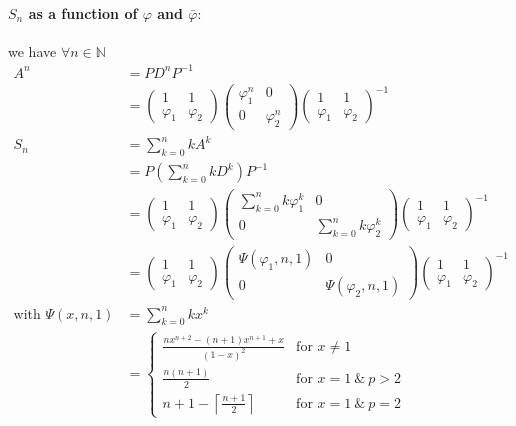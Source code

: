 \documentclass[]{article}
\begin{document}
\paragraph{$S_n$ as a function of $\varphi$ and $\bar\varphi:$}
we have $\forall n\in\mathbb{N}$
\begin{align*}
	A^n&=PD^nP^{-1}\\
	&=\begin{pmatrix}
		1 & 1 \\ \varphi_1 & \varphi_2 
	\end{pmatrix} \begin{pmatrix}
		\varphi_1^n & 0 \\ 0 & \varphi_2^n
	\end{pmatrix}\begin{pmatrix}
		1 & 1 \\ \varphi_1 & \varphi_2
	\end{pmatrix}^{-1} \\
	S_n&= \sum_{k=0}^n k A^k \\
	&= P\left(\sum_{k=0}^{n} kD^k\right)P^{-1}\\
	&= \begin{pmatrix}
		1 & 1 \\ \varphi_1 & \varphi_2 
	\end{pmatrix} \begin{pmatrix}
		\sum_{k=0}^nk\varphi_1^k& 0 \\ 0 & \sum_{k=0}^nk \varphi_2^k
	\end{pmatrix}\begin{pmatrix}
		1 & 1 \\ \varphi_1 & \varphi_2
	\end{pmatrix}^{-1} \\ 
	&= \begin{pmatrix}
		1 & 1 \\ \varphi_1 & \varphi_2 
	\end{pmatrix} \begin{pmatrix}
		\Psi(\varphi_1,n,1)& 0 \\ 0 & \Psi(\varphi_2,n,1)
	\end{pmatrix}\begin{pmatrix}
		1 & 1 \\ \varphi_1 & \varphi_2
	\end{pmatrix}^{-1} \\
	\text{with } \Psi(x,n,1)&= \sum_{k=0}^n k x^k \\
	&= \begin{cases}
		\frac{nx^{n+2}-(n+1)x^{n+1}+x}{(1-x)^2}&  \text{for } x\neq 1 \\
		\frac{n(n+1)}{2} & \text{for } x=1 \ \& \ p>2 \\
		n+1-\left\lceil \frac{n+1}{2}\right\rceil & \text{for } x=1 \ \& \ p=2
	\end{cases}
\end{align*}
\end{document}
